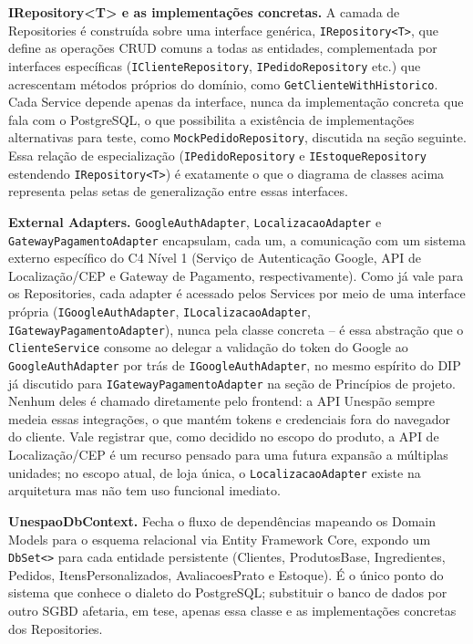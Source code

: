 \documentclass[a4paper,12pt,oneside,openany]{book}
\begin{document}
\textbf{IRepository<T> e as implementações concretas.} A camada de Repositories é construída sobre uma interface genérica, \texttt{IRepository<T>}, que define as operações CRUD comuns a todas as entidades, complementada por interfaces específicas (\texttt{IClienteRepository}, \texttt{IPedidoRepository} etc.) que acrescentam métodos próprios do domínio, como \texttt{GetClienteWithHistorico}. Cada Service depende apenas da interface, nunca da implementação concreta que fala com o PostgreSQL, o que possibilita a existência de implementações alternativas para teste, como \texttt{MockPedidoRepository}, discutida na seção seguinte. Essa relação de especialização (\texttt{IPedidoRepository} e \texttt{IEstoqueRepository} estendendo \texttt{IRepository<T>}) é exatamente o que o diagrama de classes acima representa pelas setas de generalização entre essas interfaces.

\textbf{External Adapters.} \texttt{GoogleAuthAdapter}, \texttt{LocalizacaoAdapter} e \texttt{GatewayPagamentoAdapter} encapsulam, cada um, a comunicação com um sistema externo específico do C4 Nível 1 (Serviço de Autenticação Google, API de Localização/CEP e Gateway de Pagamento, respectivamente). Como já vale para os Repositories, cada adapter é acessado pelos Services por meio de uma interface própria (\texttt{IGoogleAuthAdapter}, \texttt{ILocalizacaoAdapter}, \texttt{IGatewayPagamentoAdapter}), nunca pela classe concreta -- é essa abstração que o \texttt{ClienteService} consome ao delegar a validação do token do Google ao \texttt{GoogleAuthAdapter} por trás de \texttt{IGoogleAuthAdapter}, no mesmo espírito do DIP já discutido para \texttt{IGatewayPagamentoAdapter} na seção de Princípios de projeto. Nenhum deles é chamado diretamente pelo frontend: a API Unespão sempre medeia essas integrações, o que mantém tokens e credenciais fora do navegador do cliente. Vale registrar que, como decidido no escopo do produto, a API de Localização/CEP é um recurso pensado para uma futura expansão a múltiplas unidades; no escopo atual, de loja única, o \texttt{LocalizacaoAdapter} existe na arquitetura mas não tem uso funcional imediato.

\textbf{UnespaoDbContext.} Fecha o fluxo de dependências mapeando os Domain Models para o esquema relacional via Entity Framework Core, expondo um \texttt{DbSet<>} para cada entidade persistente (Clientes, ProdutosBase, Ingredientes, Pedidos, ItensPersonalizados, AvaliacoesPrato e Estoque). É o único ponto do sistema que conhece o dialeto do PostgreSQL; substituir o banco de dados por outro SGBD afetaria, em tese, apenas essa classe e as implementações concretas dos Repositories.
\end{document}
